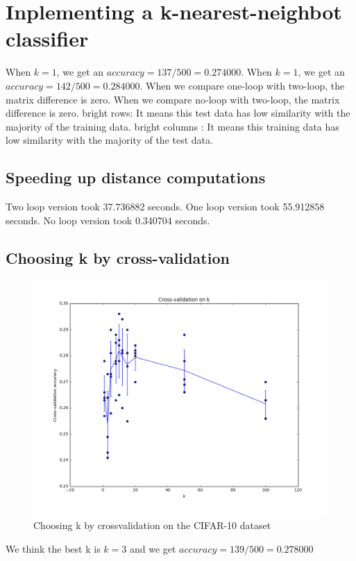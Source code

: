 \documentclass[pdftex,11pt]{article}
\begin{document}
\section{Inplementing a k-nearest-neighbot classifier}

When $k=1$, we get an $accuracy=137/500=0.274000$.
When $k=1$, we get an $accuracy=142/500=0.284000$.
When we compare one-loop with two-loop, the matrix difference is zero.
When we compare no-loop with two-loop, the matrix difference is zero.
bright rows: It means this test data has low similarity with the majority of the training data. bright columns : It means this training data has low similarity with the majority of the test data.
\subsection{Speeding up distance computations}
Two loop version took 37.736882 seconds.
One loop version took 55.912858 seconds.
No loop version took 0.340704 seconds.

\subsection{Choosing k by cross-validation}
\begin{figure}[H]
  \caption{Choosing k by crossvalidation on the CIFAR-10 dataset}
  \centering
    \includegraphics[scale=0.5]{fig1.png}
\end{figure}
We think the best k is $k=3$ and we get $accuracy=139 / 500=0.278000$
\end{document}
